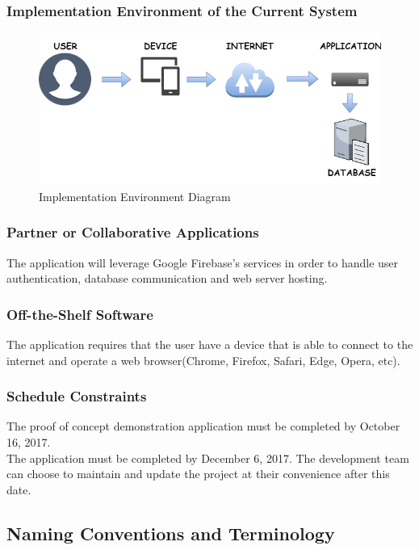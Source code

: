 \documentclass[12pt,fleqn]{article}
\begin{document}
\subsubsection {Implementation Environment of the Current System}
\begin{figure}[htp]
\centering
\includegraphics[width=16cm]{env}
\caption{Implementation Environment Diagram}
\label{fig:environment}
\end{figure}

\subsubsection {Partner or Collaborative Applications}
The application will leverage Google Firebase's services in order to handle user authentication, database communication and web server hosting.

\subsubsection {Off-the-Shelf Software}
The application requires that the user have a device that is able to connect to the internet and operate a web browser(Chrome, Firefox, Safari, Edge, Opera, etc). 

\subsubsection {Schedule Constraints}
The proof of concept demonstration application must be completed by October 16, 2017. \\
The application must be completed by December 6, 2017.  The development team can choose to maintain and update the project at their convenience after this date.


\subsection {Naming Conventions and Terminology}
\end{document}
